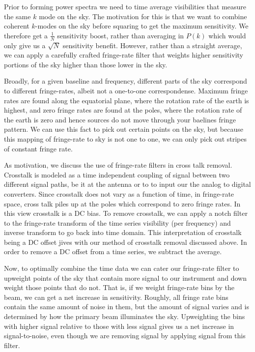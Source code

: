 \documentclass[twocolumn,numberedappendix]{emulateapj} \shorttitle{PSA64}
\begin{document}
Prior to forming power spectra we need to time average visibilities that measure
the same $k$ mode on the sky. The motivation for this is that we want to combine
coherent $k$-modes on the sky before squaring to get the maximum sensitivity. We
therefore get a $\frac{1}{N}$ sensitivity boost, rather than averaging in $P(k)$
which would only give us a $\sqrt{N}$ sensitivity benefit. However, rather than
a straight average, we can apply a carefully crafted fringe-rate filter that
weights higher sensitivity portions of the sky higher than those lower in the
sky.

Broadly, for a given baseline and frequency, different parts of the sky
correspond to different fringe-rates, albeit not a one-to-one correspondense.
Maximum fringe rates are found along the equatorial plane, where the rotation
rate of the earth is highest, and zero fringe rates are found at the poles,
where the rotation rate of the earth is zero and hence sources do not move
through your baelines fringe pattern. We can use this fact to pick out certain
points on the sky, but because this mapping of fringe-rate to sky is not one to
one, we can only pick out stripes of constant fringe rate.

As motivation, we discuss the use of fringe-rate filters in cross talk removal.
Crosstalk is modeled as a time independent coupling of signal between two
different signal paths, be it at the antenna or to to input our the analog to
digital converters. Since crosstalk does not vary as a function of time, in
fringe-rate space, cross talk piles up at the poles which correspond to zero
fringe rates. In this view crosstalk is a DC bias. To remove crosstalk, we can
apply a notch filter to the fringe-rate transform of the time series visibility
(per frequency) and inverse transform to go back into time domain. This
interpretation of crosstalk being a DC offset jives with our method of crosstalk
removal discussed above. In order to remove a DC offset from a time series, we
subtract the average.

Now, to optimally combine the time data we can cater our fringe-rate filter to
upweight points of the sky that contain more signal to our instrument and down
weight those points that do not. That is, if we weight fringe-rate
bins by the beam, we can get a net increase in sensitivity. Roughly, all fringe
rate bins contain the same amount of noise in them, but the amount of signal
varies and is determined by how the primary beam illuminates the sky.
Upweighting the bins with higher signal relative to those with less signal
gives us a net increase in signal-to-noise, even though we are removing 
signal by applying signal from this filter. 
\end{document}
